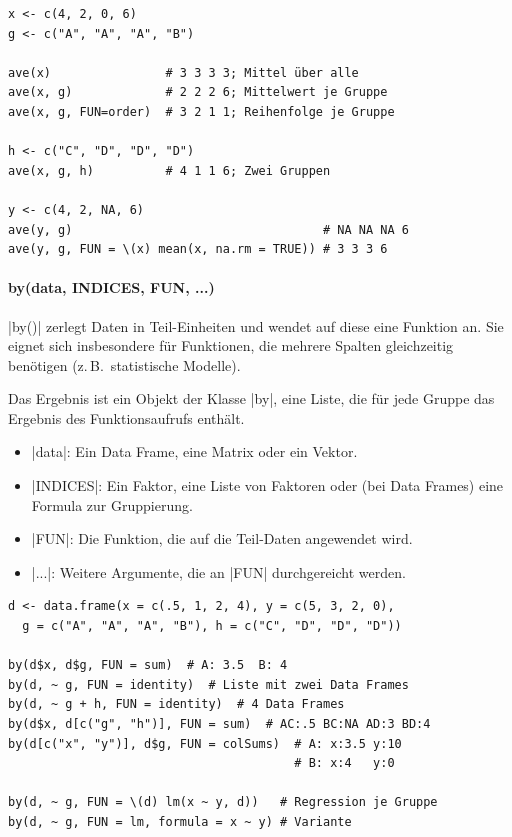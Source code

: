 \documentclass[10pt,twocolumn]{scrartcl}
\renewcommand{\lstinline}{\mycoloredinline}
\begin{document}
\begin{lstlisting}
x <- c(4, 2, 0, 6)
g <- c("A", "A", "A", "B")

ave(x)                # 3 3 3 3; Mittel über alle
ave(x, g)             # 2 2 2 6; Mittelwert je Gruppe
ave(x, g, FUN=order)  # 3 2 1 1; Reihenfolge je Gruppe

h <- c("C", "D", "D", "D")
ave(x, g, h)          # 4 1 1 6; Zwei Gruppen

y <- c(4, 2, NA, 6)
ave(y, g)                                   # NA NA NA 6
ave(y, g, FUN = \(x) mean(x, na.rm = TRUE)) # 3 3 3 6
\end{lstlisting}


\paragraph{by(data, INDICES, FUN, ...)}

\lstinline|by()| zerlegt Daten in Teil-Einheiten und wendet auf diese eine Funktion an. Sie eignet sich insbesondere für Funktionen, die mehrere Spalten gleichzeitig benötigen (z.\,B.\ statistische Modelle).

Das Ergebnis ist ein Objekt der Klasse \lstinline|by|, eine Liste, die für jede Gruppe das Ergebnis des Funktionsaufrufs enthält.

\begin{itemize}
\item \lstinline|data|: Ein Data Frame, eine Matrix oder ein Vektor.
\item \lstinline|INDICES|: Ein Faktor, eine Liste von Faktoren oder (bei Data Frames) eine Formula zur Gruppierung.
\item \lstinline|FUN|: Die Funktion, die auf die Teil-Daten angewendet wird.
\item \lstinline|...|: Weitere Argumente, die an \lstinline|FUN| durchgereicht werden.
\end{itemize}

\begin{lstlisting}
d <- data.frame(x = c(.5, 1, 2, 4), y = c(5, 3, 2, 0),
  g = c("A", "A", "A", "B"), h = c("C", "D", "D", "D"))

by(d$x, d$g, FUN = sum)  # A: 3.5  B: 4
by(d, ~ g, FUN = identity)  # Liste mit zwei Data Frames
by(d, ~ g + h, FUN = identity)  # 4 Data Frames
by(d$x, d[c("g", "h")], FUN = sum)  # AC:.5 BC:NA AD:3 BD:4
by(d[c("x", "y")], d$g, FUN = colSums)  # A: x:3.5 y:10
                                        # B: x:4   y:0

by(d, ~ g, FUN = \(d) lm(x ~ y, d))   # Regression je Gruppe
by(d, ~ g, FUN = lm, formula = x ~ y) # Variante
\end{lstlisting}
\end{document}
